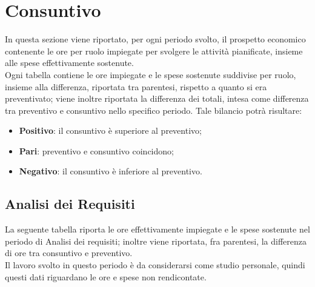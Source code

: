 \documentclass[../PianoDiProgetto.tex]{subfiles}
\begin{document}
	\section{Consuntivo}
	In questa sezione viene riportato, per ogni periodo svolto, il prospetto economico contenente le ore per ruolo impiegate per svolgere le attività pianificate, insieme alle spese effettivamente sostenute. \\
	Ogni tabella contiene le ore impiegate e le spese sostenute suddivise per ruolo, insieme alla differenza, riportata tra parentesi, rispetto a quanto si era preventivato; viene inoltre riportata la differenza dei totali, intesa come differenza tra preventivo e consuntivo nello specifico periodo.
	Tale bilancio potrà risultare:
	\begin{itemize}
		\item \textbf{Positivo}: il consuntivo è superiore al preventivo;
		\item \textbf{Pari}: preventivo e consuntivo coincidono;
		\item \textbf{Negativo}: il consuntivo è inferiore al preventivo.
	\end{itemize}

	\subsection{Analisi dei Requisiti}
	La seguente tabella riporta le ore effettivamente impiegate e le spese sostenute nel periodo di Analisi dei requisiti; inoltre viene riportata, fra parentesi, la differenza di ore tra consuntivo e preventivo. \\
	Il lavoro svolto in questo periodo è da considerarsi come studio personale, quindi questi dati riguardano le ore e spese non rendicontate.
\end{document}
